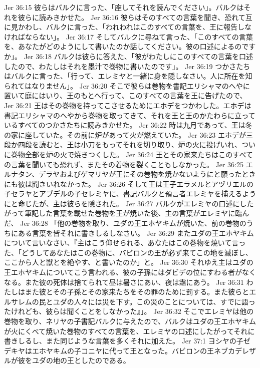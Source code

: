 Jer 36:15  彼らはバルクに言った、「座してそれを読んでください」。バルクはそれを彼らに読みきかせた。
Jer 36:16  彼らはそのすべての言葉を聞き、恐れて互に見かわし、バルクに言った、「われわれはこのすべての言葉を、王に報告しなければならない」。
Jer 36:17  そしてバルクに尋ねて言った、「このすべての言葉を、あなたがどのようにして書いたのか話してください。彼の口述によるのですか」。
Jer 36:18  バルクは彼らに答えた、「彼がわたしにこのすべての言葉を口述したので、わたしはそれを墨汁で巻物に書いたのです」。
Jer 36:19  つかさたちはバルクに言った、「行って、エレミヤと一緒に身を隠しなさい。人に所在を知られてはなりません」。
Jer 36:20  そこで彼らは巻物を書記エリシャマのへやに置いて庭にはいり、王のもとへ行って、このすべての言葉を王に告げたので、
Jer 36:21  王はその巻物を持ってこさせるためにエホデをつかわした。エホデは書記エリシャマのへやから巻物を取ってきて、それを王と王のかたわらに立っているすべてのつかさたちに読みきかせた。
Jer 36:22  時は九月であって、王は冬の家に座していた。その前に炉があって火が燃えていた。
Jer 36:23  エホデが三段か四段を読むと、王は小刀をもってそれを切り取り、炉の火に投げいれ、ついに巻物全部を炉の火で焼きつくした。
Jer 36:24  王とその家来たちはこのすべての言葉を聞いても恐れず、またその着物を裂くこともしなかった。
Jer 36:25  エルナタン、デラヤおよびゲマリヤが王にその巻物を焼かないようにと願ったときにも彼は聞きいれなかった。
Jer 36:26  そして王は王子エラメルとアヅリエルの子セラヤとアブデルの子セレミヤに、書記バルクと預言者エレミヤを捕えるようにと命じたが、主は彼らを隠された。
Jer 36:27  バルクがエレミヤの口述にしたがって筆記した言葉を載せた巻物を王が焼いた後、主の言葉がエレミヤに臨んだ、
Jer 36:28  「他の巻物を取り、ユダの王エホヤキムが焼いた、前の巻物のうちにある言葉を皆それに書きしるしなさい。
Jer 36:29  またユダの王エホヤキムについて言いなさい、『主はこう仰せられる、あなたはこの巻物を焼いて言った、「どうしてあなたはこの巻物に、バビロンの王が必ず来てこの地を滅ぼし、ここから人と獣とを絶やす、と書いたのか」と。
Jer 36:30  それゆえ主はユダの王エホヤキムについてこう言われる、彼の子孫にはダビデの位にすわる者がなくなる。また彼の死体は捨てられて昼は暑さにあい、夜は霜にあう。
Jer 36:31  わたしはまた彼とその子孫とその家来たちをその罪のために罰する。また彼らとエルサレムの民とユダの人々には災を下す。この災のことについては、すでに語ったけれども、彼らは聞くことをしなかった』」。
Jer 36:32  そこでエレミヤは他の巻物を取り、ネリヤの子書記バルクに与えたので、バルクはユダの王エホヤキムが火にくべて焼いた巻物のすべての言葉を、エレミヤの口述にしたがってそれに書きしるし、また同じような言葉を多くそれに加えた。
Jer 37:1  ヨシヤの子ゼデキヤはエホヤキムの子コニヤに代って王となった。バビロンの王ネブカデレザルが彼をユダの地の王としたのである。

